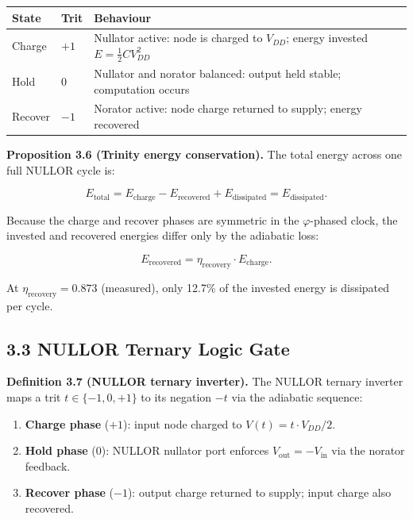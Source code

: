 \begin{longtable}[]{@{}
  >{\raggedright\arraybackslash}p{}
  >{\raggedright\arraybackslash}p{}
  >{\raggedright\arraybackslash}p{}@{}}
\toprule\noalign{}
State & Trit & Behaviour \\
\midrule\noalign{}
\endhead
\bottomrule\noalign{}
\endlastfoot
Charge & \(+1\) & Nullator active: node is charged to \(V_{DD}\); energy invested \(E = \frac{1}{2}CV_{DD}^2\) \\
Hold & \(0\) & Nullator and norator balanced: output held stable; computation occurs \\
Recover & \(-1\) & Norator active: node charge returned to supply; energy recovered \\
\end{longtable}

\textbf{Proposition 3.6 (Trinity energy conservation).} The total
energy across one full NULLOR cycle is:

\[
E_{\text{total}} = E_{\text{charge}} - E_{\text{recovered}}
+ E_{\text{dissipated}} = E_{\text{dissipated}}.
\]

Because the charge and recover phases are symmetric in the
\(\varphi\)-phased clock, the invested and recovered energies differ
only by the adiabatic loss:

\[
E_{\text{recovered}} = \eta_{\text{recovery}} \cdot E_{\text{charge}}.
\]

At \(\eta_{\text{recovery}} = 0.873\) (measured), only 12.7\% of the
invested energy is dissipated per cycle.

\subsection{3.3 NULLOR Ternary Logic Gate}

\textbf{Definition 3.7 (NULLOR ternary inverter).} The NULLOR ternary
inverter maps a trit \(t \in \{-1, 0, +1\}\) to its negation
\(-t\) via the adiabatic sequence:

\begin{enumerate}
\item \textbf{Charge phase} (\(+1\)): input node charged to
  \(V(t) = t \cdot V_{DD}/2\).
\item \textbf{Hold phase} (\(0\)): NULLOR nullator port enforces
  \(V_{\text{out}} = -V_{\text{in}}\) via the norator feedback.
\item \textbf{Recover phase} (\(-1\)): output charge returned to
  supply; input charge also recovered.
\end{enumerate}

